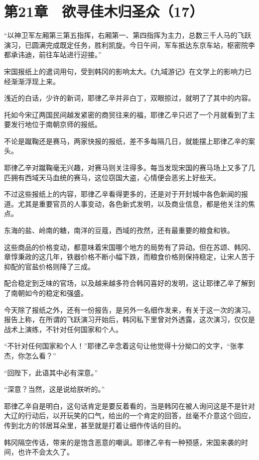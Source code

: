 \section{第21章　欲寻佳木归圣众（17）}

“以神卫军左厢第三第五指挥，右厢第一、第四指挥为主力，总数三千人马的飞跃演习，已圆满完成既定任务，胜利凯旋。今日午间，军车抵达东京车站，枢密院李都承讳迪，前往车站进行迎接。”

宋国报纸上的遣词用句，受到韩冈的影响太大。《九域游记》在文学上的影响力已经渐渐浮现上来。

浅近的白话，少许的新词，耶律乙辛并非白丁，双眼掠过，就明了了其中的内容。

托如今宋辽两国民间越发紧密的商贸往来的福，耶律乙辛只迟了一个月就看到了主要发行地位于南朝京师的报纸。

不论是蹴鞠还是赛马，两家快报的报纸，差不多每隔几日，就能摆上耶律乙辛的案头。

耶律乙辛对蹴鞠毫无兴趣，对赛马则关注得多。每当发现宋国的赛马场上又多了几匹拥有西域天马血统的赛马，这位窃国大盗，心情便会恶劣上好些天。

不过这些报纸上的内容，耶律乙辛看得更多的，还是对于开封城中各色新闻的报道。尤其是重要官员的人事变动，各色新式发明，以及商业信息，都是他关注的焦点。

东海的盐、岭南的糖，南洋的豆蔻，西域的孜然，还有最重要的粮食和铁。

这些商品的价格变动，都意味着宋国哪个地方的局势有了异动。但在苏颂、韩冈、章惇秉政的这几年，铁器价格不断小幅下跌，而粮食价格则保持稳定，让宋人苦于抑配的官盐价格则降了三成。

配合稳定到乏味的官场，以及越来越多符合韩冈喜好的发明，这让耶律乙辛了解到了南朝如今的稳定和强盛。

今天除了报纸之外，还有一份报告，是另外一名细作发来，有关于这一次的演习。报告上称，在所谓的飞跃演习开始后，韩冈私下里曾对外透露，这次演习，仅仅是战术上演练，不针对任何国家和个人。

“不针对任何国家和个人！”耶律乙辛念着这句让他觉得十分拗口的文字，“张孝杰，你怎么看？”

“回陛下，此语其中必有深意。”

“深意？当然，这是说给朕听的。”

耶律乙辛自是明白，这句话肯定是要反着看的，当是韩冈在被人询问这是不是针对大辽的行动后，以开玩笑的口气，给出的一个肯定的回答，丝毫不介意这个回应，传到北方的邻居耳朵里，甚至就是打着让细作传话的目的。

韩冈隔空传话，带来的是饱含恶意的嘲讽。耶律乙辛有一种预感，宋国来袭的时间，也许不会太久了。

